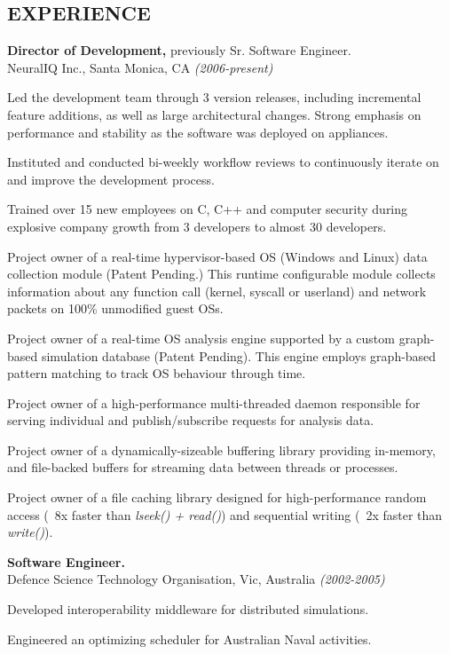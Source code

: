 \documentclass[margin]{res}
\begin{document}
\begin{resume}
\section{EXPERIENCE}
\noindent
{\bf Director of Development,} previously Sr. Software Engineer. \\ 
NeuralIQ Inc., Santa Monica, CA {\em (2006-present)}
\begin{list}{}{\leftmargin=1.5em \topsep=5pt \partopsep=0pt \parsep=2.5pt}
  \item Led the development team through 3 version releases, including
    incremental feature additions, as well as large architectural
    changes.  Strong emphasis on performance and stability as the
    software was deployed on appliances.
  \item Instituted and conducted bi-weekly workflow reviews to
    continuously iterate on and improve the development process.
  \item Trained over 15 new employees on C, C++ and computer security
    during explosive company growth from 3 developers to almost 30
    developers.
  \item Project owner of a real-time hypervisor-based OS (Windows and
    Linux) data collection module (Patent Pending.)  This runtime
    configurable module collects information about any function call
    (kernel, syscall or userland) and network packets on 100\%
    unmodified guest OSs.
  \item Project owner of a real-time OS analysis engine supported by a
    custom graph-based simulation database (Patent Pending).  This
    engine employs graph-based pattern matching to track OS behaviour
    through time.
  \item Project owner of a high-performance multi-threaded daemon
    responsible for serving individual and publish/subscribe requests
    for analysis data.
  \item Project owner of a dynamically-sizeable buffering library
    providing in-memory, and file-backed buffers for streaming
    data between threads or processes.
  \item Project owner of a file caching library designed for
    high-performance random access (\string~8x faster than {\em
      lseek() + read()}) and sequential writing (\string~2x faster
    than {\em write()}).
\end{list}

{\bf Software Engineer.} \\
Defence Science Technology Organisation, Vic, Australia {\em (2002-2005)}
\begin{list}{}{\leftmargin=1.5em \topsep=5pt \partopsep=0pt \parsep=2.5pt}
  \item Developed interoperability middleware for distributed simulations.
  \item Engineered an optimizing scheduler for Australian Naval activities.
\end{list}


\end{resume}
\end{document}
